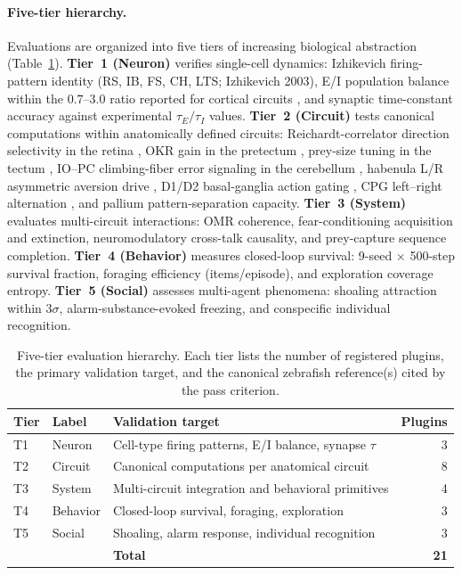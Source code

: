 \documentclass[12pt]{article}
\begin{document}
\paragraph{Five-tier hierarchy.}
Evaluations are organized into five tiers of increasing biological
abstraction (Table~\ref{tab:eval_tiers}).
\textbf{Tier~1 (Neuron)} verifies single-cell dynamics: Izhikevich
firing-pattern identity (RS, IB, FS, CH, LTS; Izhikevich 2003), E/I
population balance within the $0.7$--$3.0$ ratio reported for cortical
circuits \citep{okun2008}, and synaptic time-constant accuracy
against experimental $\tau_E/\tau_I$ values.
\textbf{Tier~2 (Circuit)} tests canonical computations within
anatomically defined circuits: Reichardt-correlator direction selectivity
in the retina \citep{borst2011}, OKR gain in the pretectum
\citep{kubo2014}, prey-size tuning in the tectum
\citep{delbene2010}, IO--PC climbing-fiber error signaling
in the cerebellum \citep{ito2001}, habenula L/R asymmetric
aversion drive \citep{amo2014}, D1/D2 basal-ganglia action gating
\citep{grillner2005}, CPG left--right alternation \citep{kiehn2016},
and pallium pattern-separation capacity.
\textbf{Tier~3 (System)} evaluates multi-circuit interactions: OMR
coherence, fear-conditioning acquisition and extinction, neuromodulatory
cross-talk causality, and prey-capture sequence completion.
\textbf{Tier~4 (Behavior)} measures closed-loop survival: 9-seed $\times$
500-step survival fraction, foraging efficiency (items/episode), and
exploration coverage entropy.
\textbf{Tier~5 (Social)} assesses multi-agent phenomena: shoaling
attraction within $3\sigma$, alarm-substance-evoked freezing, and
conspecific individual recognition.

\begin{table}[H]
\centering
\caption{Five-tier evaluation hierarchy. Each tier lists the number of
registered plugins, the primary validation target, and the canonical
zebrafish reference(s) cited by the pass criterion.}
\label{tab:eval_tiers}
\small
\begin{tabular}{lllr}
\toprule
Tier & Label & Validation target & Plugins \\
\midrule
T1 & Neuron   & Cell-type firing patterns, E/I balance, synapse $\tau$ & 3 \\
T2 & Circuit  & Canonical computations per anatomical circuit            & 8 \\
T3 & System   & Multi-circuit integration and behavioral primitives      & 4 \\
T4 & Behavior & Closed-loop survival, foraging, exploration              & 3 \\
T5 & Social   & Shoaling, alarm response, individual recognition         & 3 \\
\midrule
   &          & \textbf{Total}                                           & \textbf{21} \\
\bottomrule
\end{tabular}
\end{table}
\end{document}
